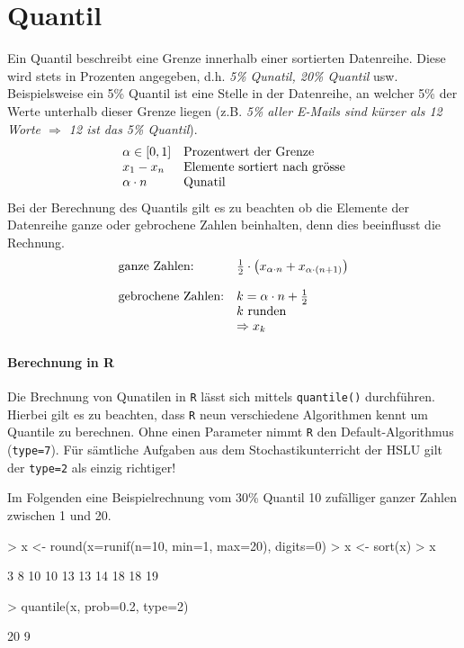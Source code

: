 \section{Quantil}
Ein \gls{Quantil} beschreibt eine Grenze innerhalb einer sortierten 
Datenreihe. Diese wird stets in Prozenten angegeben, d.h. 
\emph{5\% Qunatil, 20\% Quantil} usw. 
Beispielsweise ein 5\% Quantil ist eine Stelle in der Datenreihe, an 
welcher 5\% der Werte unterhalb dieser Grenze liegen (z.B. \emph{5\% 
aller E-Mails sind kürzer als 12 Worte $\Rightarrow$ 12 ist das 5\%
Quantil}).
\[ \begin{array}{l l}
	\alpha \in [0, 1] 
		& \text{Prozentwert der Grenze} \\
	x_1 - x_n
		& \text{Elemente sortiert nach grösse} \\
	\alpha \cdot n 
		& \text{Qunatil} \\
\end{array} \]
Bei der Berechnung des Quantils gilt es zu beachten ob die Elemente 
der Datenreihe ganze oder gebrochene Zahlen beinhalten, denn dies 
beeinflusst die Rechnung.
\[ \begin{array}{l l}
	\text{ganze Zahlen:}
		& \frac{1}{2} \cdot \left(
			x_{\alpha \cdot n} 
			+ x_{\alpha \cdot (n + 1)} \right)  \\
	& \\
	\text{gebrochene Zahlen:}
		& k = \alpha \cdot n + \frac{1}{2}  \\
		& k \text{ runden} \\
		& \Rightarrow x_{k}
\end{array} \]

\paragraph{Berechnung in R}
Die Brechnung von Qunatilen in \lstinline{R} lässt sich mittels 
\lstinline{quantile()} durchführen. Hierbei gilt es zu beachten, dass
\lstinline{R} neun verschiedene Algorithmen kennt um Quantile zu 
berechnen. Ohne einen Parameter nimmt \lstinline{R} den 
Default-Algorithmus (\lstinline{type=7}). Für sämtliche Aufgaben aus dem
Stochastikunterricht der HSLU gilt der \lstinline{type=2} als einzig
richtiger! 

Im Folgenden eine Beispielrechnung vom 30\% \gls{Quantil} 10 zufälliger 
ganzer Zahlen zwischen 1 und 20.
\begin{Schunk}
\begin{Sinput}
> x <- round(x=runif(n=10, min=1, max=20), digits=0)
> x <- sort(x)
> x
\end{Sinput}
\begin{Soutput}
 [1]  3  8 10 10 13 13 14 18 18 19
\end{Soutput}
\begin{Sinput}
> quantile(x, prob=0.2, type=2)
\end{Sinput}
\begin{Soutput}
20%
  9 
\end{Soutput}
\end{Schunk}

